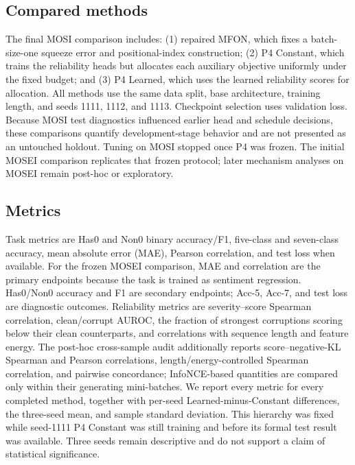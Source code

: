\subsection{Compared methods}\label{compared-methods}

The final MOSI comparison includes: (1) repaired MFON, which fixes a
batch-size-one squeeze error and positional-index construction; (2) P4
Constant, which trains the reliability heads but allocates each
auxiliary objective uniformly under the fixed budget; and (3) P4
Learned, which uses the learned reliability scores for allocation. All
methods use the same data split, base architecture, training length, and
seeds 1111, 1112, and 1113. Checkpoint selection uses validation loss.
Because MOSI test diagnostics influenced earlier head and schedule
decisions, these comparisons quantify development-stage behavior and are
not presented as an untouched holdout. Tuning on MOSI stopped once P4 was
frozen. The initial MOSEI comparison replicates that frozen protocol;
later mechanism analyses on MOSEI remain post-hoc or exploratory.

\subsection{Metrics}\label{metrics}

Task metrics are Has0 and Non0 binary accuracy/F1, five-class and
seven-class accuracy, mean absolute error (MAE), Pearson correlation,
and test loss when available. For the frozen MOSEI comparison, MAE and
correlation are the primary endpoints because the task is trained as
sentiment regression. Has0/Non0 accuracy and F1 are secondary endpoints;
Acc-5, Acc-7, and test loss are diagnostic outcomes. Reliability metrics
are severity--score Spearman correlation, clean/corrupt AUROC, the fraction
of strongest corruptions scoring below their clean counterparts, and
correlations with sequence length and feature energy. The post-hoc
cross-sample audit additionally reports score--negative-KL Spearman and
Pearson correlations, length/energy-controlled Spearman correlation, and
pairwise concordance; InfoNCE-based quantities are compared only within their
generating mini-batches. We report every metric
for every completed method, together with per-seed Learned-minus-Constant
differences, the three-seed mean, and sample standard deviation. This
hierarchy was fixed while seed-1111 P4 Constant was still training and before
its formal test result was available. Three seeds remain descriptive and do
not support a claim of statistical significance.

